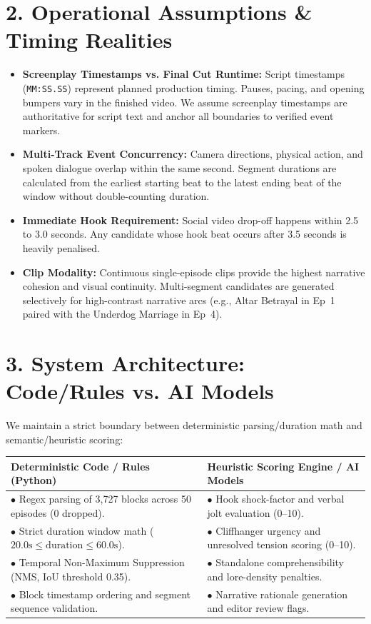 \documentclass[10pt,a4paper]{article}
\begin{document}
\section*{2. Operational Assumptions \& Timing Realities}
\begin{itemize}[leftmargin=1.2em]
    \item \textbf{Screenplay Timestamps vs. Final Cut Runtime:} Script timestamps (\texttt{MM:SS.SS}) represent planned production timing. Pauses, pacing, and opening bumpers vary in the finished video. We assume screenplay timestamps are authoritative for script text and anchor all boundaries to verified event markers.
    \item \textbf{Multi-Track Event Concurrency:} Camera directions, physical action, and spoken dialogue overlap within the same second. Segment durations are calculated from the earliest starting beat to the latest ending beat of the window without double-counting duration.
    \item \textbf{Immediate Hook Requirement:} Social video drop-off happens within 2.5 to 3.0 seconds. Any candidate whose hook beat occurs after 3.5 seconds is heavily penalised.
    \item \textbf{Clip Modality:} Continuous single-episode clips provide the highest narrative cohesion and visual continuity. Multi-segment candidates are generated selectively for high-contrast narrative arcs (e.g., Altar Betrayal in Ep~1 paired with the Underdog Marriage in Ep~4).
\end{itemize}

\section*{3. System Architecture: Code/Rules vs. AI Models}
We maintain a strict boundary between deterministic parsing/duration math and semantic/heuristic scoring:
\vspace{-0.2em}
\begin{center}
\small
\begin{tabularx}{\textwidth}{|X|X|}
\hline
\textbf{Deterministic Code / Rules (Python)} & \textbf{Heuristic Scoring Engine / AI Models} \\
\hline
$\bullet$ Regex parsing of 3,727 blocks across 50 episodes (0 dropped). & $\bullet$ Hook shock-factor and verbal jolt evaluation (0--10). \\
$\bullet$ Strict duration window math ($20.0\text{s} \le \text{duration} \le 60.0\text{s}$). & $\bullet$ Cliffhanger urgency and unresolved tension scoring (0--10). \\
$\bullet$ Temporal Non-Maximum Suppression (NMS, IoU threshold 0.35). & $\bullet$ Standalone comprehensibility and lore-density penalties. \\
$\bullet$ Block timestamp ordering and segment sequence validation. & $\bullet$ Narrative rationale generation and editor review flags. \\
\hline
\end{tabularx}
\end{center}
\vspace{-0.4em}
\end{document}
